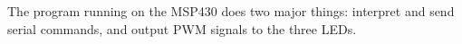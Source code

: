 
The program running on the MSP430 does two major things: interpret and send serial commands, and output PWM signals to the three LEDs.

